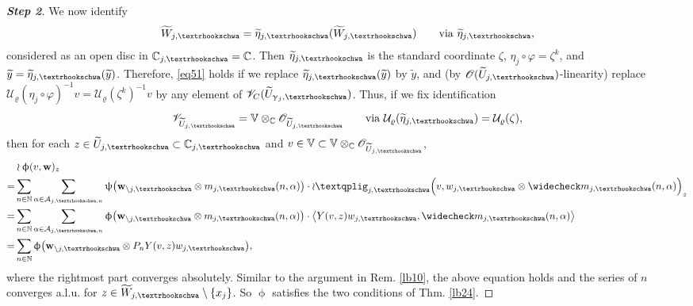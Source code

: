 \documentclass[12pt,a4paper,notitlepage]{article}
\theoremstyle{definition}
\theoremstyle{plain}
\newcommand{\mc}{\mathcal}
\newcommand{\wtd}{\widetilde}
\newcommand{\wch}{\widecheck}
\newcommand{\scr}{\mathscr}
\newcommand{\Vbb}{\mathbb V}
\newcommand{\Cbb}{\mathbb C}
\newcommand{\Nbb}{\mathbb N}
\newcommand{\wbf}{\mathbf w}
\newcommand{\tipae}{\text{\textrhookschwa}}
\newcommand{\tipxphi}{\text{\textqplig}}
\numberwithin{equation}{subsection}
\begin{document}
\begin{proof}[\textbf{Step 2}]
We now identify
\begin{align*}
\wtd W_{j,\tipae}=\wtd\eta_{j,\tipae}	(\wtd W_{j,\tipae})\qquad\text{via }\wtd\eta_{j,\tipae},
\end{align*}
considered as an open disc in $\Cbb_{j,\tipae}=\Cbb$. Then $\wtd\eta_{j,\tipae}$ is the standard coordinate $\zeta$, $\eta_j\circ\varphi=\zeta^k$, and $\wtd y=\wtd\eta_{j,\tipae}(\wtd y)$. Therefore, \eqref{eq51} holds if we replace $\wtd \eta_{j,\tipae}(\wtd y)$ by $\wtd y$, and (by $\scr O(\wtd U_{j,\tipae})$-linearity) replace $\mc U_\varrho(\eta_j\circ\varphi)^{-1}v=\mc U_\varrho(\zeta^k)^{-1}v$ by any element of $\scr V_C(\wtd U_{\upgamma_j,\tipae})$. Thus, if we fix identification
\begin{align*}
\scr V_{\wtd U_{j,\tipae}}=\Vbb\otimes_\Cbb\scr O_{\wtd U_{j,\tipae}}\qquad\text{via }\mc U_\varrho(\wtd\eta_{j,\tipae})=\mc U_\varrho(\zeta),	
\end{align*}
then for each $z\in\wtd U_{j,\tipae}\subset\Cbb_{j,\tipae}$  and $v\in\Vbb\subset\Vbb\otimes_\Cbb\scr O_{\wtd U_{j,\tipae}}$,
\begin{align*}
&\wr\upphi(v,\wbf)_z\nonumber\\
=&\sum_{n\in\Nbb}\sum_{\alpha\in\mc A_{j,\tipae,n}}\uppsi\big(\wbf_{\setminus j,\tipae}\otimes m_{j,\tipae}(n,\alpha) \big)\cdot \wr\tipxphi_{j,\tipae}\Big(v,w_{j,\tipae}\otimes\wch m_{j,\tipae}(n,\alpha)\Big)_z\\
=&\sum_{n\in\Nbb}\sum_{\alpha\in\mc A_{j,\tipae,n}}\upphi\big(\wbf_{\setminus j,\tipae}\otimes m_{j,\tipae}(n,\alpha) \big)\cdot\big\langle Y(v,z)w_{j,\tipae},\wch m_{j,\tipae}(n,\alpha)\big\rangle\\
=&\sum_{n\in\Nbb}\upphi\big(\wbf_{\setminus j,\tipae}\otimes P_nY(v,z)w_{j,\tipae} \big),
\end{align*}
where the rightmost part converges absolutely. Similar to the argument in Rem. \ref{lb10}, the above equation holds and the series of $n$ converges a.l.u. for $z\in\wtd W_{j,\tipae}\setminus\{x_j\}$. So $\upphi$ satisfies the two conditions of Thm. \ref{lb24}. 
\end{proof}
\end{document}
